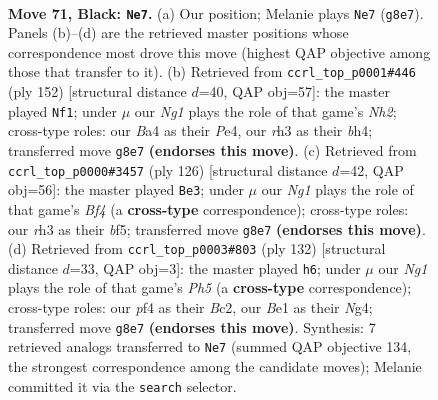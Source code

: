 \documentclass[11pt]{article}
\begin{document}
\clearpage

\begin{figure}[p]\centering
\begin{subfigure}{0.46\textwidth}\centering
\resizebox{\linewidth}{!}{%
\newchessgame
\chessboard[
  setfen={6n1/pR3k2/P6p/1P3p2/b4P2/7R/3r4/4b1K1 b - - 12 71},
  showmover=false,
  pgfstyle=straightmove, color=movearrow, markmove={g8-e7}
]}
\caption{}
\end{subfigure}\hfill
\begin{subfigure}{0.46\textwidth}\centering
\resizebox{\linewidth}{!}{%
\newchessgame
\chessboard[
  setfen={2R5/3P4/6k1/4p3/2p1Pp1b/5P1P/7N/3r2K1 w - - 11 77},
  showmover=false,
  pgfstyle=straightmove, color=movearrow, markmove={h2-f1}
]}
\caption{}
\end{subfigure}
\\[4pt]
\begin{subfigure}{0.46\textwidth}\centering
\resizebox{\linewidth}{!}{%
\newchessgame
\chessboard[
  setfen={8/5p1p/2k5/5b1P/1p3B2/1Pr2K2/P2R4/8 w - - 9 64},
  showmover=false,
  pgfstyle=straightmove, color=movearrow, markmove={f4-e3}
]}
\caption{}
\end{subfigure}\hfill
\begin{subfigure}{0.46\textwidth}\centering
\resizebox{\linewidth}{!}{%
\newchessgame
\chessboard[
  setfen={5k2/8/p4P2/1p4bP/1Pr3N1/P1p3K1/2B5/8 w - - 0 67},
  showmover=false,
  pgfstyle=straightmove, color=movearrow, markmove={h5-h6}
]}
\caption{}
\end{subfigure}
\caption{\textbf{Move 71, Black: \texttt{Ne7}.} (a) Our position; Melanie plays \texttt{Ne7} (\texttt{g8e7}). Panels (b)--(d) are the retrieved master positions whose correspondence most drove this move (highest QAP objective among those that transfer to it). (b) Retrieved from \texttt{ccrl\_top\_p0001\#446} (ply 152) [structural distance $d$=40, QAP obj=57]: the master played \texttt{Nf1}; under $\mu$ our \emph{Ng1} plays the role of that game's \emph{Nh2}; cross-type roles: our \emph{B}a4 as their \emph{P}e4, our \emph{r}h3 as their \emph{b}h4; transferred move \texttt{g8e7} \textbf{(endorses this move)}. (c) Retrieved from \texttt{ccrl\_top\_p0000\#3457} (ply 126) [structural distance $d$=42, QAP obj=56]: the master played \texttt{Be3}; under $\mu$ our \emph{Ng1} plays the role of that game's \emph{Bf4} (a \textbf{cross-type} correspondence); cross-type roles: our \emph{r}h3 as their \emph{b}f5; transferred move \texttt{g8e7} \textbf{(endorses this move)}. (d) Retrieved from \texttt{ccrl\_top\_p0003\#803} (ply 132) [structural distance $d$=33, QAP obj=3]: the master played \texttt{h6}; under $\mu$ our \emph{Ng1} plays the role of that game's \emph{Ph5} (a \textbf{cross-type} correspondence); cross-type roles: our \emph{p}f4 as their \emph{B}c2, our \emph{B}e1 as their \emph{N}g4; transferred move \texttt{g8e7} \textbf{(endorses this move)}. Synthesis: 7 retrieved analogs transferred to \texttt{Ne7} (summed QAP objective 134, the strongest correspondence among the candidate moves); Melanie committed it via the \texttt{search} selector.}
\label{fig:thought-m141}
\end{figure}
\end{document}
